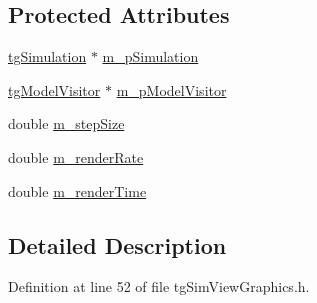 \subsection*{Protected Attributes}
\begin{DoxyCompactItemize}
\item 
\hyperlink{classtg_simulation}{tg\-Simulation} $\ast$ \hyperlink{classtg_sim_view_a5e1b7f8fee44f02f76f8b32e3bd49d81}{m\-\_\-p\-Simulation}
\item 
\hyperlink{classtg_model_visitor}{tg\-Model\-Visitor} $\ast$ \hyperlink{classtg_sim_view_a4f19b09ac8cc273071fb5f7ff5e59a6b}{m\-\_\-p\-Model\-Visitor}
\item 
double \hyperlink{classtg_sim_view_a150d4c27a7a07d538aa405407e6ec239}{m\-\_\-step\-Size}
\item 
double \hyperlink{classtg_sim_view_a94f30c9f4a98a01c7171de6d7d00e92a}{m\-\_\-render\-Rate}
\item 
double \hyperlink{classtg_sim_view_af9665b86a366fc966bedf3f11fc1917d}{m\-\_\-render\-Time}
\end{DoxyCompactItemize}


\subsection{Detailed Description}


Definition at line 52 of file tg\-Sim\-View\-Graphics.\-h.



